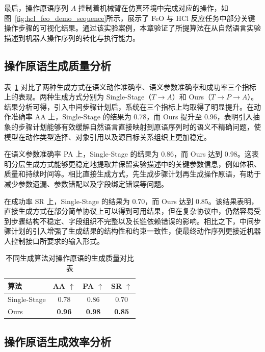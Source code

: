 最后，操作原语序列 $A$ 控制着机械臂在仿真环境中完成对应的操作，如图~\ref{fig:hcl_feo_demo_sequence}所示，展示了 FeO 与 HCl 反应任务中部分关键操作步骤的可视化结果。通过该实验案例，本章验证了所提算法在从自然语言实验描述到机器人操作序列的转化与执行能力。


\subsection{操作原语生成质量分析}

表~\ref{tab:ch5_ablation_tpa} 对比了两种生成方式在语义动作准确率、语义参数准确率和成功率三个指标上的表现。两种生成方式分别为 Single-Stage（$T \rightarrow A$）和 Ours（$T \rightarrow P \rightarrow A$）。结果分析可得，引入中间步骤计划后，系统在三个指标上均取得了明显提升。在动作准确率 AA 上，Single-Stage 的结果为 0.78，而 Ours 提升至 0.96，表明引入抽象的步骤计划能够有效缓解自然语言直接映射到原语序列时的语义不精确问题，使模型在动作类型选择、对象引用以及源目标关系组织上更加稳定。

在语义参数准确率 PA 上，Single-Stage 的结果为 0.86，而 Ours 达到 0.98。这表明分层生成方式能够更稳定地提取并保留实验描述中的关键参数信息，例如体积、质量和持续时间等。相比直接生成方式，先生成步骤计划再生成操作原语，有助于减少参数遗漏、参数错配以及字段绑定错误等问题。

在成功率 SR 上，Single-Stage 的结果为 0.70，而 Ours 达到 0.85。该结果表明，直接生成方式在部分简单协议上可以得到可用结果，但在复杂协议中，仍然容易受到步骤结构不稳定、字段组织不完整以及长链依赖错误的影响。相比之下，中间步骤计划的引入增强了生成结果的结构性和约束一致性，使最终动作序列更接近机器人控制接口所要求的输入形式。


\begin{table}[htbp]
\centering
\caption{不同生成算法对操作原语的生成质量对比表}
\label{tab:ch5_ablation_tpa}
\small
\setlength{\tabcolsep}{8pt}
\begin{tabular}{lccc}
\toprule
算法 & AA $\uparrow$ & PA $\uparrow$ & SR $\uparrow$ \\
\midrule
Single-Stage & 0.78 & 0.86 & 0.70 \\
Ours & \textbf{0.96} & \textbf{0.98} & \textbf{0.85} \\
\bottomrule
\end{tabular}
\end{table}



\subsection{操作原语生成效率分析}

